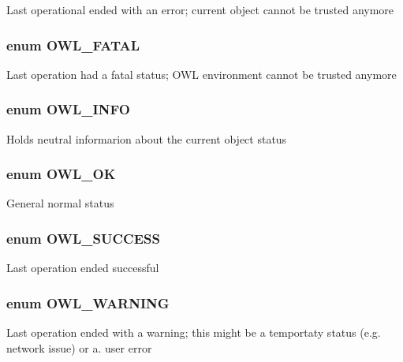 Last operational ended with an error; current object cannot be trusted anymore \hypertarget{owl_8severitycodes_8php_4c27106ebf80027ef1ebf953ed172e76}{
\subsubsection{\setlength{\rightskip}{0pt plus 5cm}enum {\bf OWL\_\-FATAL}}}
\label{owl_8severitycodes_8php_4c27106ebf80027ef1ebf953ed172e76}


Last operation had a fatal status; OWL environment cannot be trusted anymore \hypertarget{owl_8severitycodes_8php_139328861128689f2f4def6a399d9057}{
\subsubsection{\setlength{\rightskip}{0pt plus 5cm}enum {\bf OWL\_\-INFO}}}
\label{owl_8severitycodes_8php_139328861128689f2f4def6a399d9057}


Holds neutral informarion about the current object status \hypertarget{owl_8severitycodes_8php_bc72c053cfd10025fe57797c41eab18e}{
\subsubsection{\setlength{\rightskip}{0pt plus 5cm}enum {\bf OWL\_\-OK}}}
\label{owl_8severitycodes_8php_bc72c053cfd10025fe57797c41eab18e}


General normal status \hypertarget{owl_8severitycodes_8php_96223f06ba27bf5cbefa6e9d702897c2}{
\subsubsection{\setlength{\rightskip}{0pt plus 5cm}enum {\bf OWL\_\-SUCCESS}}}
\label{owl_8severitycodes_8php_96223f06ba27bf5cbefa6e9d702897c2}


Last operation ended successful \hypertarget{owl_8severitycodes_8php_ce886152e2e86cd2e91cb833fd495adb}{
\subsubsection{\setlength{\rightskip}{0pt plus 5cm}enum {\bf OWL\_\-WARNING}}}
\label{owl_8severitycodes_8php_ce886152e2e86cd2e91cb833fd495adb}


Last operation ended with a warning; this might be a temportaty status (e.g. network issue) or a. user error 